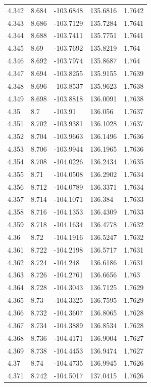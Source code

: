 \begin{tabular}{lllll}
4.342 & 8.684 & -103.6848 & 135.6816 & 1.7642 \\
4.343 & 8.686 & -103.7129 & 135.7284 & 1.7641 \\
4.344 & 8.688 & -103.7411 & 135.7751 & 1.7641 \\
4.345 & 8.69 & -103.7692 & 135.8219 & 1.764 \\
4.346 & 8.692 & -103.7974 & 135.8687 & 1.764 \\
4.347 & 8.694 & -103.8255 & 135.9155 & 1.7639 \\
4.348 & 8.696 & -103.8537 & 135.9623 & 1.7638 \\
4.349 & 8.698 & -103.8818 & 136.0091 & 1.7638 \\
4.35 & 8.7 & -103.91 & 136.056 & 1.7637 \\
4.351 & 8.702 & -103.9381 & 136.1028 & 1.7637 \\
4.352 & 8.704 & -103.9663 & 136.1496 & 1.7636 \\
4.353 & 8.706 & -103.9944 & 136.1965 & 1.7636 \\
4.354 & 8.708 & -104.0226 & 136.2434 & 1.7635 \\
4.355 & 8.71 & -104.0508 & 136.2902 & 1.7634 \\
4.356 & 8.712 & -104.0789 & 136.3371 & 1.7634 \\
4.357 & 8.714 & -104.1071 & 136.384 & 1.7633 \\
4.358 & 8.716 & -104.1353 & 136.4309 & 1.7633 \\
4.359 & 8.718 & -104.1634 & 136.4778 & 1.7632 \\
4.36 & 8.72 & -104.1916 & 136.5247 & 1.7632 \\
4.361 & 8.722 & -104.2198 & 136.5717 & 1.7631 \\
4.362 & 8.724 & -104.248 & 136.6186 & 1.7631 \\
4.363 & 8.726 & -104.2761 & 136.6656 & 1.763 \\
4.364 & 8.728 & -104.3043 & 136.7125 & 1.7629 \\
4.365 & 8.73 & -104.3325 & 136.7595 & 1.7629 \\
4.366 & 8.732 & -104.3607 & 136.8065 & 1.7628 \\
4.367 & 8.734 & -104.3889 & 136.8534 & 1.7628 \\
4.368 & 8.736 & -104.4171 & 136.9004 & 1.7627 \\
4.369 & 8.738 & -104.4453 & 136.9474 & 1.7627 \\
4.37 & 8.74 & -104.4735 & 136.9945 & 1.7626 \\
4.371 & 8.742 & -104.5017 & 137.0415 & 1.7626 \\

\end{tabular}
